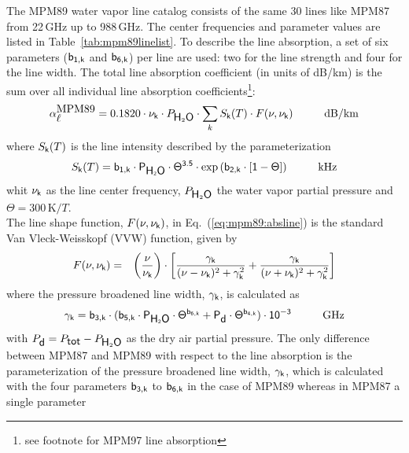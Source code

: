 {
\label{levele:mpm89_h2olines}
The MPM89 water vapor line catalog consists of the same 30 lines 
like MPM87 from 22\,GHz up to 988\,GHz. The center frequencies and parameter 
values are listed in Table~\ref{tab:mpm89linelist}. To describe the line 
absorption, a set of six parameters ($\sf b_{\sf 1,k}$ and $\sf b_{\sf 6,k}$) per line are used: two 
for the line strength and four for the line width. The total line 
absorption coefficient (in units of dB/km) is the sum over all
individual line absorption coefficients\footnote{see footnote for
  MPM97 line absorption}:
\begin{equation}
  \label{eq:mpm89:absline}
  \alphampmml = 0.1820 \cdot \nuk \cdot \phzo \cdot 
  \sum_{k}{\inten \cdot \shape}\hspace*{10mm}\mbox{dB/km}
\end{equation}
where $S_{\sf k}(T)$ is the line intensity described by the parameterization
\begin{equation}
  \label{eq:mpm89:strength}
  \inten = \bek \cdot \phzo \cdot \Theta^{3.5} 
           \cdot \exp{(\bzk \cdot [1-\Theta])}\hspace*{10mm}\mbox{kHz}
\end{equation}
whit $\nu_{\sf k}$ as the line center frequency, $P_{\mbox{\sf H}_{2}\mbox{\sf O}}$ the water
vapor partial pressure and $\Theta = 300\,\mbox{K}/T$.\\
The line shape function, $F(\nu,\nu_{\sf k})$, in Eq.~(\ref{eq:mpm89:absline}) 
is the standard Van Vleck-Weisskopf (VVW) function, given by 
\begin{eqnarray}
  \label{eq:mpm89:VVW}
  F(\nu,\nu_{\sf k}) & = & \left(\frac{\nu}{\nu_{\sf k}}\right) \cdot 
               \left[\frac{\gamma_{\sf k}}{(\nu - \nu_{\sf k})^2 + \gamma_{\sf k}^2} + 
                     \frac{\gamma_{\sf k}}{(\nu + \nu_{\sf k})^2 + \gamma_{\sf k}^2}\right]
\end{eqnarray}
where the pressure broadened line width, $\gamma_{\sf k}$, is calculated as
\begin{equation}
  \label{eq:mpm89:gamma}
  \gamk = \bdk \cdot 
         (\bfk \cdot \phzo \cdot \Theta^{\bsk} + 
                     \pda  \cdot \Theta^{\bvk})
        \cdot 10^{-3}\hspace*{10mm}\mbox{GHz}
\end{equation}
with $P_{\mbox{\sf d}}=P_{\mbox{\sf tot}}-P_{\mbox{\sf H}_{2}\mbox{\sf O}}$ as the dry air partial pressure. 
The only difference between MPM87 and MPM89 with respect to the line 
absorption is the parameterization of the pressure broadened line
width, $\gamma_{\sf k}$, which is calculated with the four parameters $\sf b_{\sf 3,k}$ to
$\sf b_{\sf 6,k}$ in the case of MPM89 whereas in MPM87 a single parameter
}
